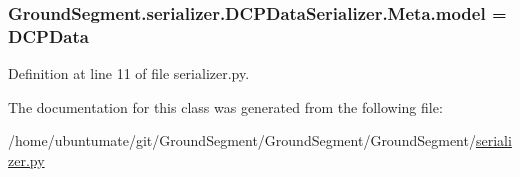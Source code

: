 \subsubsection[{model}]{\setlength{\rightskip}{0pt plus 5cm}Ground\+Segment.\+serializer.\+D\+C\+P\+Data\+Serializer.\+Meta.\+model = {\bf D\+C\+P\+Data}\hspace{0.3cm}{\ttfamily [static]}}\label{class_ground_segment_1_1serializer_1_1_d_c_p_data_serializer_1_1_meta_ac5063805bbf442fa667da549a90df5b5}


Definition at line 11 of file serializer.\+py.



The documentation for this class was generated from the following file\+:\begin{DoxyCompactItemize}
\item 
/home/ubuntumate/git/\+Ground\+Segment/\+Ground\+Segment/\+Ground\+Segment/\hyperlink{serializer_8py}{serializer.\+py}\end{DoxyCompactItemize}
